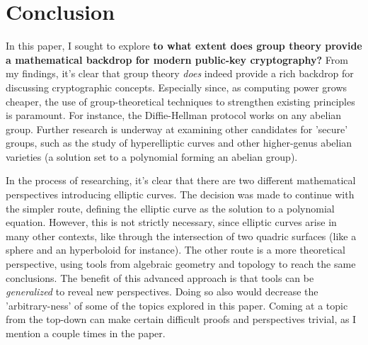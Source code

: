 \documentclass[11pt, a4paper]{report}
\begin{document}

\section{Conclusion}

In this paper, I sought to explore \textbf{to what extent does group theory provide a mathematical backdrop for modern public-key cryptography?} From my findings, it's clear that group theory \textit{does} indeed provide a rich backdrop for discussing cryptographic concepts. Especially since, as computing power grows cheaper, the use of group-theoretical techniques to strengthen existing principles is paramount. For instance, the Diffie-Hellman protocol works on any abelian group. Further research is underway at examining other candidates for 'secure' groups, such as the study of hyperelliptic curves and other higher-genus abelian varieties (a solution set to a polynomial forming an abelian group).

In the process of researching, it's clear that there are two different mathematical perspectives introducing elliptic curves. The decision was made to continue with the simpler route, defining the elliptic curve as the solution to a polynomial equation. However, this is not strictly necessary, since elliptic curves arise in many other contexts, like through the intersection of two quadric surfaces (like a sphere and an hyperboloid for instance). The other route is a more theoretical perspective, using tools from algebraic geometry and topology to reach the same conclusions. The benefit of this advanced approach is that tools can be \textit{generalized} to reveal new perspectives. Doing so also would decrease the 'arbitrary-ness' of some of the topics explored in this paper. Coming at a topic from the top-down can make certain difficult proofs and perspectives trivial, as I mention a couple times in the paper.
\end{document}
